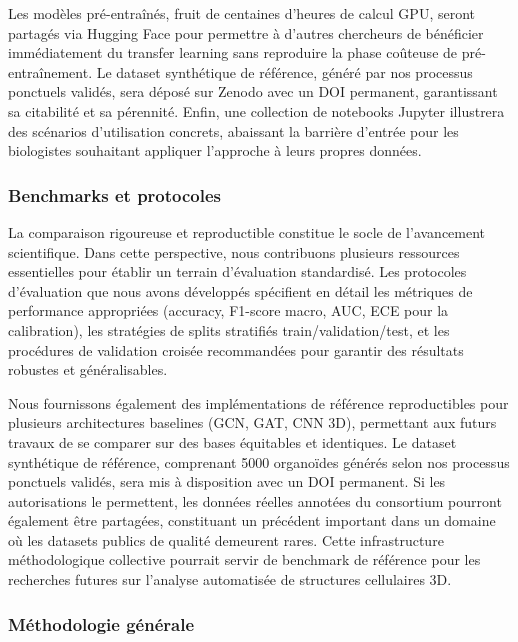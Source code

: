 Les modèles pré-entraînés, fruit de centaines d'heures de calcul GPU, seront partagés via Hugging Face pour permettre à d'autres chercheurs de bénéficier immédiatement du transfer learning sans reproduire la phase coûteuse de pré-entraînement. Le dataset synthétique de référence, généré par nos processus ponctuels validés, sera déposé sur Zenodo avec un DOI permanent, garantissant sa citabilité et sa pérennité. Enfin, une collection de notebooks Jupyter illustrera des scénarios d'utilisation concrets, abaissant la barrière d'entrée pour les biologistes souhaitant appliquer l'approche à leurs propres données.

\subsubsection{Benchmarks et protocoles}

La comparaison rigoureuse et reproductible constitue le socle de l'avancement scientifique. Dans cette perspective, nous contribuons plusieurs ressources essentielles pour établir un terrain d'évaluation standardisé. Les protocoles d'évaluation que nous avons développés spécifient en détail les métriques de performance appropriées (accuracy, F1-score macro, AUC, ECE pour la calibration), les stratégies de splits stratifiés train/validation/test, et les procédures de validation croisée recommandées pour garantir des résultats robustes et généralisables.

Nous fournissons également des implémentations de référence reproductibles pour plusieurs architectures baselines (GCN, GAT, CNN 3D), permettant aux futurs travaux de se comparer sur des bases équitables et identiques. Le dataset synthétique de référence, comprenant 5000 organoïdes générés selon nos processus ponctuels validés, sera mis à disposition avec un DOI permanent. Si les autorisations le permettent, les données réelles annotées du consortium pourront également être partagées, constituant un précédent important dans un domaine où les datasets publics de qualité demeurent rares. Cette infrastructure méthodologique collective pourrait servir de benchmark de référence pour les recherches futures sur l'analyse automatisée de structures cellulaires 3D.

\subsubsection{Méthodologie générale}

